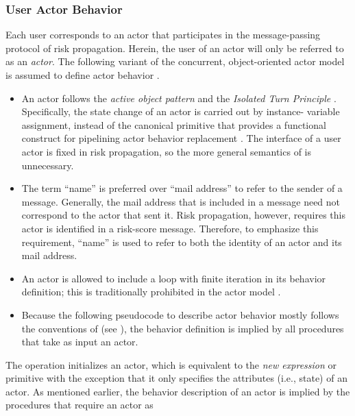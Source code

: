 \subsubsection{User Actor Behavior}\label{sec:behavior}

Each user corresponds to an actor that participates in the message-passing
protocol of risk propagation. Herein, the user of an actor will only be
referred to as an \emph{actor}. The following variant of the concurrent,
object-oriented actor model is assumed to define actor behavior
\cite{Agha1985, Agha1990}.
%
\begin{itemize}
	\item An actor follows the \emph{active object pattern} \cite{Lavender1996, Koster2016} and the \emph{Isolated Turn Principle} \cite{Koster2016}. Specifically, the state change of an actor is carried out by instance- variable assignment, instead of the canonical \cBecome{} primitive that provides a functional construct for pipelining actor behavior replacement \cite{AghaThesis1985, Agha1985, Agha1990}. The interface of a user actor is fixed in risk propagation, so the more general semantics of \cBecome{} is unnecessary.
	\item The term ``name'' \cite{Hewitt1977, AghaThesis1985} is preferred over ``mail address'' \cite{AghaThesis1985, Agha1985, Agha1990} to refer to the sender of a message. Generally, the mail address that is included in a message need not correspond to the actor that sent it. Risk propagation, however, requires this actor is identified in a risk-score message. Therefore, to emphasize this requirement, ``name'' is used to refer to both the identity of an actor and its mail address.
	\item An actor is allowed to include a loop with finite iteration in its behavior definition; this is traditionally prohibited in the actor model \cite{AghaThesis1985, Agha1990}.
	\item Because the following pseudocode to describe actor behavior mostly follows the conventions of \cite{Cormen2022} (see ), the behavior definition is implied by all procedures that take as input an actor.
\end{itemize}
%
The \cCreateActor{} operation initializes an actor, which is equivalent to the
\emph{new expression} \cite{AghaThesis1985} or \cCreate{} primitive
\cite{Agha1985, Agha1990} with the exception that it only specifies the
attributes (i.e., state) of an actor. As mentioned earlier, the behavior
description of an actor is implied by the procedures that require an actor as

